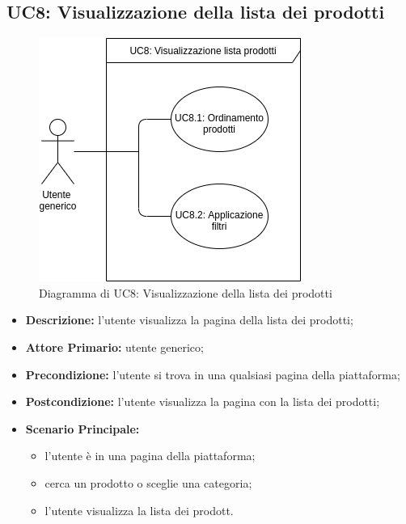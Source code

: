 \subsection{UC8: Visualizzazione della lista dei prodotti}
        \label{sec:UC8}
        \begin{figure}[!ht]
            \caption{Diagramma di UC8: Visualizzazione della lista dei prodotti}
            \vspace{10px}
            \includegraphics[scale=0.5]{../../../Images/AnalisiRequisiti/UC08.png}
            \centering
        \end{figure}
        \begin{itemize}
            \item \textbf{Descrizione:} l'utente visualizza la pagina della lista dei prodotti;
            \item \textbf{Attore Primario:} utente generico;
            \item \textbf{Precondizione:} l'utente si trova in una qualsiasi pagina della piattaforma;
            \item \textbf{Postcondizione:} l'utente visualizza la pagina con la lista dei prodotti;
            \item \textbf{Scenario Principale:}
            \begin{itemize}
                \item l'utente è in una pagina della piattaforma;
                \item cerca un prodotto o sceglie una categoria;
                \item l'utente visualizza la lista dei prodott.
            \end{itemize}
        \end{itemize}
